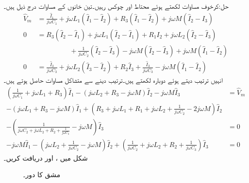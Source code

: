 حل:کرخوف مساوات لکھتے ہوئے محتاط اور چوکس رہیں۔تین خانوں کے مساوات درج ذیل ہیں۔
\begin{equation*}
 \begin{split}
\hat{V}_m&=\frac{\hat{I}_1}{j\omega C_1}+j\omega L_1 (\hat{I}_1-\hat{I}_2)+R_3(\hat{I}_1-\hat{I}_2)+j\omega M(\hat{I}_2-\hat{I}_3)\\
0&=R_3(\hat{I}_2-\hat{I}_1)+j\omega L_1(\hat{I}_2-\hat{I}_1)+R_1 I_2+j\omega L_2(\hat{I}_2-\hat{I}_3)\\
&\hspace{2cm} +\frac{1}{j\omega C_2}(\hat{I}_2-\hat{I}_3)-j\omega M(\hat{I}_2-\hat{I}_3)+j\omega M(\hat{I}_1-\hat{I}_2) \\
0&=\frac{\hat{I}_3}{j\omega C_3}+j\omega L_2(\hat{I}_3-\hat{I}_2)+R_2 \hat{I}_3+\frac{\hat{I}_3}{j\omega C_3}-j\omega M(\hat{I}_1-\hat{I}_2)
\end{split}
\end{equation*}
انہیں ترتیب دیتے ہوئے دوبارہ لکھتے ہیں۔ترتیب دینے سے متشاکل مساوات حاصل ہوتے ہیں۔
\begin{equation*}
\begin{split}
\left(\frac{1}{j\omega C_1}+j\omega L_1+R_3\right)\hat{I}_1-\left(j\omega L_2+R_3-j\omega M\right)\hat{I}_2-j\omega M \hat{I}_3&=\hat{V}_m\\
-\left(j\omega L_1+R_3-j\omega M\right)\hat{I}_1+\left(R_3+j\omega L_1+R_1+j\omega L_2+\frac{1}{j\omega C_2}-2j\omega M\right)\hat{I}_2 &\\
-\left(\frac{1}{j\omega C_2+j\omega L_2+R_2+\frac{1}{j\omega C_3}}-j\omega M\right)\hat{I}_3&=0\\
-j\omega M \hat{I}_1-\left(j\omega L_2+\frac{1}{j\omega C_2}-j\omega M\right)\hat{I}_2+\left(\frac{1}{j\omega C_2}+j\omega L_2+R_2+\frac{1}{j\omega C_3}\right)\hat{I}_3&=0
\end{split}
\end{equation*}
شکل  میں ،  اور  دریافت کریں۔

\begin{figure}
\centering
{}
\caption{مشق  کا دور۔}
\label{شکل_مقناطیسی_مشق_مربوط_دور_الف}
\end{figure}

